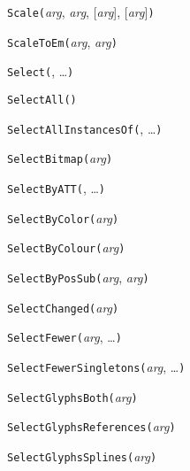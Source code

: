 
\noindent\texttt{Scale(}\textit{arg}, \textit{arg}, [\textit{arg}], [\textit{arg}]\texttt{)}


\noindent\texttt{ScaleToEm(}\textit{arg}, \textit{arg}\texttt{)}


\noindent\texttt{Select(}, \ldots\texttt{)}


\noindent\texttt{SelectAll(}\texttt{)}


\noindent\texttt{SelectAllInstancesOf(}, \ldots\texttt{)}


\noindent\texttt{SelectBitmap(}\textit{arg}\texttt{)}


\noindent\texttt{SelectByATT(}, \ldots\texttt{)}


\noindent\texttt{SelectByColor(}\textit{arg}\texttt{)}


\noindent\texttt{SelectByColour(}\textit{arg}\texttt{)}


\noindent\texttt{SelectByPosSub(}\textit{arg}, \textit{arg}\texttt{)}


\noindent\texttt{SelectChanged(}\textit{arg}\texttt{)}


\noindent\texttt{SelectFewer(}\textit{arg}, \ldots\texttt{)}


\noindent\texttt{SelectFewerSingletons(}\textit{arg}, \ldots\texttt{)}


\noindent\texttt{SelectGlyphsBoth(}\textit{arg}\texttt{)}


\noindent\texttt{SelectGlyphsReferences(}\textit{arg}\texttt{)}


\noindent\texttt{SelectGlyphsSplines(}\textit{arg}\texttt{)}

